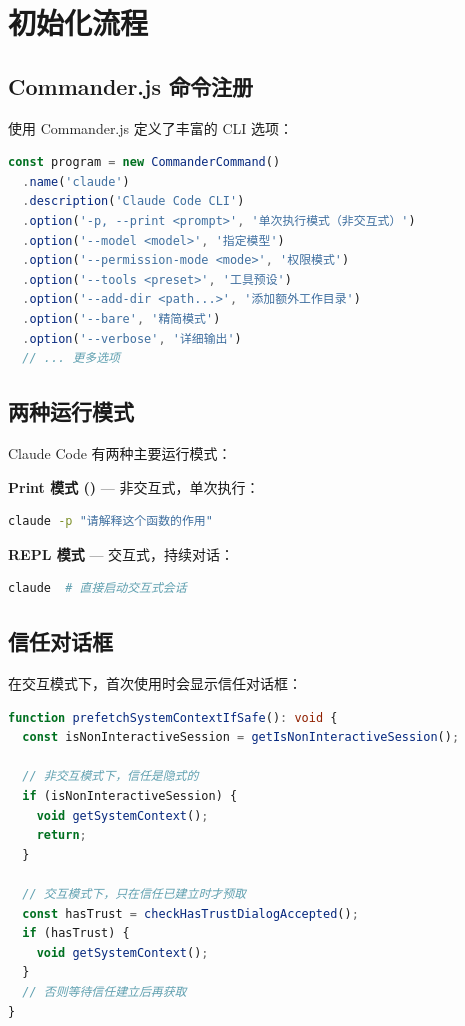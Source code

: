 \section{初始化流程}

\subsection{Commander.js 命令注册}

 使用 Commander.js 定义了丰富的 CLI 选项：

\begin{lstlisting}[language=TypeScript,breaklines=true]
const program = new CommanderCommand()
  .name('claude')
  .description('Claude Code CLI')
  .option('-p, --print <prompt>', '单次执行模式（非交互式）')
  .option('--model <model>', '指定模型')
  .option('--permission-mode <mode>', '权限模式')
  .option('--tools <preset>', '工具预设')
  .option('--add-dir <path...>', '添加额外工作目录')
  .option('--bare', '精简模式')
  .option('--verbose', '详细输出')
  // ... 更多选项
\end{lstlisting}

\subsection{两种运行模式}

Claude Code 有两种主要运行模式：

\textbf{Print 模式 ()} — 非交互式，单次执行：
\begin{lstlisting}[language=bash,breaklines=true]
claude -p "请解释这个函数的作用" 
\end{lstlisting}

\textbf{REPL 模式} — 交互式，持续对话：
\begin{lstlisting}[language=bash,breaklines=true]
claude  # 直接启动交互式会话
\end{lstlisting}

\subsection{信任对话框}

在交互模式下，首次使用时会显示信任对话框：

\begin{lstlisting}[language=TypeScript,breaklines=true]
function prefetchSystemContextIfSafe(): void {
  const isNonInteractiveSession = getIsNonInteractiveSession();

  // 非交互模式下，信任是隐式的
  if (isNonInteractiveSession) {
    void getSystemContext();
    return;
  }

  // 交互模式下，只在信任已建立时才预取
  const hasTrust = checkHasTrustDialogAccepted();
  if (hasTrust) {
    void getSystemContext();
  }
  // 否则等待信任建立后再获取
}
\end{lstlisting}


